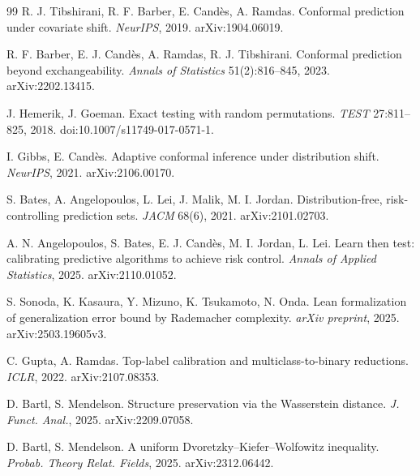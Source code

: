 \begin{thebibliography}{99}
 R. J. Tibshirani, R. F. Barber, E. Cand\`es,
A. Ramdas. Conformal prediction under covariate shift. \emph{NeurIPS}, 2019.
arXiv:1904.06019.

 R. F. Barber, E. J. Cand\`es, A. Ramdas, R. J. Tibshirani.
Conformal prediction beyond exchangeability. \emph{Annals of Statistics}
51(2):816--845, 2023. arXiv:2202.13415.

 J. Hemerik, J. Goeman.
Exact testing with random permutations. \emph{TEST} 27:811--825, 2018.
doi:10.1007/s11749-017-0571-1.

 I. Gibbs, E. Cand\`es. Adaptive conformal inference under
distribution shift. \emph{NeurIPS}, 2021. arXiv:2106.00170.

 S. Bates, A. Angelopoulos, L. Lei, J. Malik, M. I. Jordan.
Distribution-free, risk-controlling prediction sets. \emph{JACM} 68(6), 2021.
arXiv:2101.02703.

 A. N. Angelopoulos, S. Bates, E. J. Cand\`es,
M. I. Jordan, L. Lei. Learn then test: calibrating predictive algorithms to achieve
risk control. \emph{Annals of Applied Statistics}, 2025. arXiv:2110.01052.

 S. Sonoda, K. Kasaura, Y. Mizuno, K. Tsukamoto, N. Onda.
Lean formalization of generalization error bound by Rademacher complexity.
\emph{arXiv preprint}, 2025. arXiv:2503.19605v3.

 C. Gupta, A. Ramdas. Top-label calibration and
multiclass-to-binary reductions. \emph{ICLR}, 2022. arXiv:2107.08353.

\ifdefined\IncludeAuditableRefs
{} D. Bartl, S. Mendelson. Structure preservation via the
Wasserstein distance. \emph{J. Funct. Anal.}, 2025. arXiv:2209.07058.

 D. Bartl, S. Mendelson. A uniform
Dvoretzky--Kiefer--Wolfowitz inequality. \emph{Probab. Theory Relat. Fields}, 2025.
arXiv:2312.06442.


\end{thebibliography}
